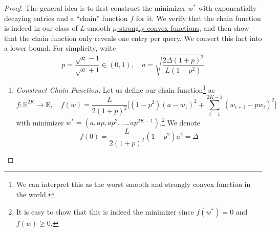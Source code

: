 	\begin{proof}
		The general idea is to first construct the minimizer $w^\ast$ with exponentially decaying entries and a ``chain'' function $f$ for it. We verify that the chain function is indeed in our class of $L$-smooth \hyperref[mv-def:mu-strongly-convex]{$\mu$-strongly convex functions}, and then show that the chain function only reveals one entry per query. We convert this fact into a lower bound. For simplicity, write 
		\begin{equation}
			p = \frac{\sqrt{\kappa} - 1}{\sqrt{\kappa} + 1} \in (0, 1), \quad a = \sqrt{ \frac{2\Delta (1 + p)^2}{L (1 - p^2)}}
		\end{equation}
		\begin{enumerate}
		  \item \textit{Construct Chain Function}. Let us define our chain function\footnote{We can interpret this as the worst smooth and strongly convex function in the world.} as 
				\begin{equation}
					f: \mathbb{R}^{2K} \to \mathbb{R}, \quad f(w) = \frac{L}{2(1 + p)^2} \bigg[ (1 - p^2) (a - w_1)^2 + \sum_{i=1}^{2K-1} (w_{i+1} - p w_i)^2 \bigg]
				\end{equation}
				with minimizer $w^\ast = (a, ap, ap^2, \ldots, ap^{2K-1})$.\footnote{It is easy to show that this is indeed the minimizer since $f(w^\ast) = 0$ and $f(w) \geq 0$.} We denote 
				\begin{equation}
					f(0) = \frac{L}{2 (1 + p)^2} (1 - p^2) a^2 = \Delta
				\end{equation}


\end{enumerate}
\end{proof}
